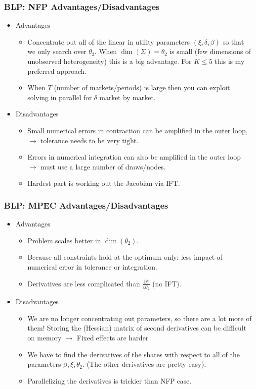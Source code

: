 \begin{frame}
\frametitle{BLP: NFP Advantages/Disadvantages}
\begin{itemize}
\item Advantages
\begin{itemize}
\item Concentrate out all of the linear in utility parameters $(\xi,\delta,\beta)$ so that we only search over $\theta_2$. When $\dim(\Sigma)=\theta_2$ is small (few dimensions of unobserved heterogeneity) this is a big advantage. For $K \leq 5$ this is my preferred approach.
\item When $T$ (number of markets/periods) is large then you can exploit solving in parallel for $\delta$ market by market.
\end{itemize}
\item Disadvantages
\begin{itemize}
\item Small numerical errors in contraction can be amplified in the outer loop, $\rightarrow$ tolerance needs to be very tight.
\item Errors in numerical integration can also be amplified in the outer loop $\rightarrow$ must use a large number of draws/nodes.
\item Hardest part is working out the Jacobian via IFT.
\end{itemize}
\end{itemize}
\end{frame}

\begin{frame}
\frametitle{BLP: MPEC Advantages/Disadvantages}
\begin{itemize}
\item Advantages
\begin{itemize}
\item Problem scales better in $\dim(\theta_2)$.
\item Because all constraints hold at the optimum only: less impact of numerical error in tolerance or integration.
\item Derivatives are less complicated than $\frac{\partial \delta}{\partial \theta_2}$ (no IFT).
\end{itemize}
\item Disadvantages
\begin{itemize}
\item We are no longer concentrating out parameters, so there are a lot more of them! Storing the (Hessian) matrix of second derivatives can be difficult on memory $\rightarrow$ Fixed effects are harder
\item We have to find the derivatives of the shares with respect to all of the parameters $\beta,\xi,\theta_2$. (The other derivatives are pretty easy).
\item Parallelizing the derivatives is trickier than NFP case.
\end{itemize}
\end{itemize}
\end{frame}



